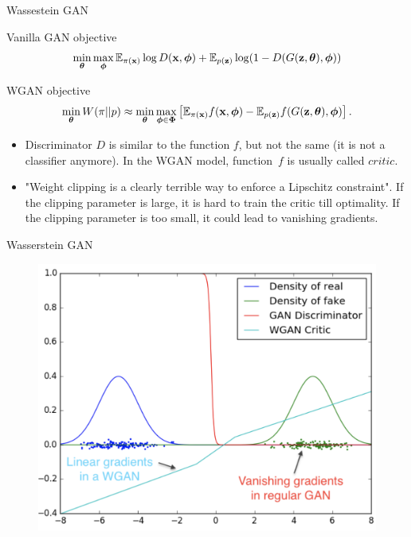 \begin{frame}{Wassestein GAN}
	\begin{block}{Vanilla GAN objective}
		\vspace{-0.2cm}
		\[
			\min_{\boldsymbol{\theta}} \max_{\boldsymbol{\phi}} \mathbb{E}_{\pi(\mathbf{x})} \log D(\mathbf{x}, \boldsymbol{\phi}) + \mathbb{E}_{p(\mathbf{z})} \log (1 - D(G(\mathbf{z}, \boldsymbol{\theta}), \boldsymbol{\phi}))
		\]
		\vspace{-0.2cm}
	\end{block}
	\begin{block}{WGAN objective}
		\vspace{-0.6cm}
		\[
		\min_{\boldsymbol{\theta}} W(\pi || p) \approx \min_{\boldsymbol{\theta}} \max_{\boldsymbol{\phi} \in \boldsymbol{\Phi}} \left[ \mathbb{E}_{\pi(\mathbf{x})} f(\mathbf{x}, \boldsymbol{\phi})  - \mathbb{E}_{p(\mathbf{z})} f(G(\mathbf{z}, \boldsymbol{\theta}), \boldsymbol{\phi} )\right].
		\]
	\end{block}
	\begin{itemize}
		\item Discriminator $D$ is similar to the function $f$, but not the same (it is not a classifier anymore). In the WGAN model, function~$f$ is usually called $\textit{critic}$.
		\item "Weight clipping is a clearly terrible way to enforce a Lipschitz constraint". If the clipping parameter is large, it is hard to train the critic till optimality. If the clipping parameter is too small, it could lead to vanishing gradients.
	\end{itemize}

\end{frame}
\begin{frame}{Wasserstein GAN}
	\begin{figure}
		\centering
		\includegraphics[width=0.8\linewidth]{figs/wgan_toy}
	\end{figure}

\end{frame}
